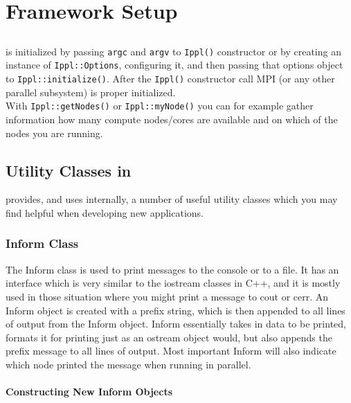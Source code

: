 \chapter{Framework Setup}
\label{sec:setup}

\section{}
\ippl is initialized by passing \texttt{argc} and \texttt{argv} to \texttt{Ippl()} constructor or by creating an instance of \texttt{Ippl::Options}, configuring it, and then passing that options object to \texttt{Ippl::initialize()}. After the \texttt{Ippl()} constructor call MPI (or any other parallel subsystem) is proper initialized. \\
With \texttt{Ippl::getNodes()} or \texttt{Ippl::myNode()} you can for example gather information how many compute nodes/cores are available and on which of the nodes you are running. \\
\begin{code}
#include "Ippl.h"
int main(int argc, char *argv[])
{
    Ippl ippl(argc,argv);
    .....
\end{code}

\section{ Utility Classes in \ippl}
\ippl provides, and uses internally, a number of useful utility classes which you may find helpful when developing new applications.

\subsection{Inform Class}
The Inform class is used to print messages to the console or to a file. It has an interface which is very similar to the iostream classes in C++, and it is mostly used in those situation where you might print a message to cout or cerr. An Inform object is created with a prefix string, which is then appended to all lines of output from the Inform object. Inform essentially takes in data to be printed, formats it for printing just as an ostream object would, but also appends the prefix message to all lines of output. Most important Inform will also indicate which node printed the message when running in parallel.

\subsubsection{Constructing New Inform Objects}

